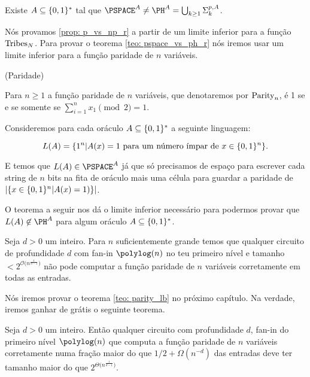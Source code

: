 \begin{teo} \label{teo: pspace_vs_ph_r}

Existe $A \subseteq \{0, 1\}^{*}$ tal que $\PSPACE^{A} \neq \PH^{A} = \bigcup_{k \geq 1} \Sigma_{k}^{p, A}$.

\end{teo}

Nós provamos \ref{prop: p_vs_np_r} a partir de um limite inferior para a função $\text{Tribes}_{N}$. Para provar o teorema \ref{teo: pspace_vs_ph_r} nós iremos usar um limite inferior para a função paridade de $n$ variáveis.

\begin{defi} (Paridade) \label{parity}

Para $n \geq 1$ a função paridade de $n$ variáveis, que denotaremos por $\text{Parity}_{n}$, é 1 se e se somente se $\sum_{i = 1}^{n} x_{1} \pmod{2} = 1$.

\end{defi}

Consideremos para cada oráculo $A \subseteq \{0, 1\}^{*}$ a seguinte linguagem:

\begin{equation*}
    L(A) = \{1^{n} \lvert A(x) = 1 \text{ para um número ímpar de } x \in \{0, 1\}^{n}\}.
\end{equation*}

E temos que $L(A) \in \PSPACE^{A}$ já que só precisamos de espaço para escrever cada string de $n$ bits na fita de oráculo mais uma célula para guardar a paridade de $\lvert \{x \in \{0, 1\}^{n} \lvert A(x) = 1)\} \rvert$.

O teorema a seguir nos dá o limite inferior necessário para podermos provar que $L(A) \not\in \PH^{A}$ para algum oráculo $A \subseteq \{0, 1\}^{*}$. 

\begin{teo} \label{teo: parity_lb}

Seja $d > 0$ um inteiro. Para $n$ suficientemente grande temos que qualquer circuito de profundidade $d$ com fan-in $\polylog(n)$ no teu primeiro nível e tamanho $< 2^{\mathcal{O}\big(n^{\frac{1}{d - 1}}\big)}$ não pode computar a função paridade de $n$ variáveis corretamente em todas as entradas. 

\end{teo}

Nós iremos provar o teorema \ref{teo: parity_lb} no próximo capítulo. Na verdade, iremos ganhar de grátis o seguinte teorema.

\begin{teo} \label{teo: parity_lb_app}

Seja $d > 0$ um inteiro. Então qualquer circuito com profundidade $d$, fan-in do primeiro nível $\polylog(n)$ que computa a função paridade de $n$ variáveis corretamente numa fração maior do que $1/2 + \Omega(n^{-d})$ das entradas deve ter tamanho maior do que $2^{\Theta\big(n^{\frac{1}{d - 1}}\big)}$.

\end{teo}


